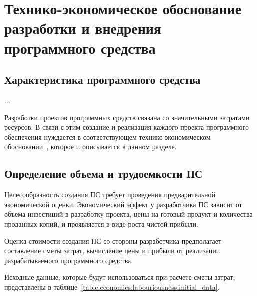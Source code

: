 


\section{Технико-экономическое обоснование разработки и внедрения программного средства}
\label{sec:economics}

\subsection{Характеристика программного средства}
\label{sec:economics:description}

...

Разработки проектов программных средств связана со значительными затратами ресурсов. В связи с этим создание и реализация каждого проекта программного обеспечения нуждается в соответствующем технико-экономическом обосновании~\cite{palitsyn}, которое и описывается в данном разделе.

\subsection{Определение объема и трудоемкости ПС}
\label{sec:economics:labouriousness}

Целесообразность создания ПС требует проведения предварительной экономической оценки. Экономический эффект у разработчика ПС зависит от объема инвестиций в разработку проекта, цены на готовый продукт и количества проданных копий, и проявляется в виде роста чистой прибыли.

Оценка стоимости создания ПС со стороны разработчика предполагает составление сметы затрат, вычисление цены и прибыли от реализации разрабатываемого программного средства.

Исходные данные, которые будут использоваться при расчете сметы затрат, представлены в таблице~\ref{table:economics:labouriousness:initial_data}.

